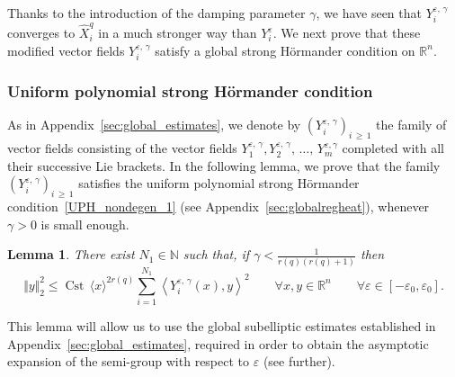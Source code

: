 \documentclass[10pt]{amsart}
\newtheorem{lemm}[theo]{Lemma}\newtheorem{prop}[theo]{Proposition}\newtheorem{coro}[theo]{Corollary}\newtheorem{conj}[theo]{Conjecture}
\theoremstyle{definition}\newtheorem{defi}[theo]{Definition}\newtheorem{rema}[theo]{Remark}\newtheorem{exam}[theo]{Example}\newtheorem{exem}[theo]{Example}\newtheorem{nota}[theo]{Notation}
\newcommand*\R{\mathbb{R}}
\newcommand*\N{\mathbb{N}}
\DeclareMathOperator{\Cst}{Cst}
\renewcommand{\geq}{\geqslant}
\renewcommand{\leq}{\leqslant}
\let\oldforall\forall
\renewcommand*{\forall}{\mathrel{\oldforall}}
\begin{document}
Thanks to the introduction of the damping parameter $\gamma$, we have seen that $Y_i^{\varepsilon,\,\gamma}$ converges to $\widehat{X}_i^{q}$ in a much stronger way than $Y_i^\varepsilon$. We next prove that these modified vector fields $Y_i^{\varepsilon,\,\gamma}$ satisfy a global strong H\"ormander condition on $\R^n$.


\subsubsection{Uniform polynomial strong H\"ormander condition}
As in Appendix~\ref{sec:global_estimates}, we denote by $(Y_i^{\varepsilon,\,\gamma})_{i\,\geq\,1}$ the family of vector fields consisting of the vector fields $Y_1^{\varepsilon,\,\gamma}, Y_2^{\varepsilon,\,\gamma},\,\ldots,\,Y_m^{\varepsilon,\gamma}$ completed with all their successive Lie brackets. In the following lemma, we prove that the family $(Y_i^{\varepsilon,\,\gamma})_{i\,\geq\,1}$ satisfies the uniform polynomial strong H\"ormander condition~\eqref{UPH_nondegen_1} (see Appendix~\ref{sec:globalregheat}), whenever $\gamma>0$ is small enough.

\begin{lemm}\label{lem_unif_poly_Hormander}
There exist $N_1\in\N$ such that, if $\gamma<\frac{1}{r(q)(r(q)+1)}$ then
\begin{equation}\label{ccl_lem_unif_poly_Hormander}
\Vert y\Vert_2^2 \leq \Cst\, \langle x\rangle^{2r(q)} \sum_{i=1}^{N_1} \left\langle Y_i^{\varepsilon,\,\gamma}(x),y\right\rangle^2
\qquad \forall x,y\in\R^n\qquad\forall \varepsilon\in[-\varepsilon_0,\varepsilon_0].
\end{equation}
\end{lemm}

This lemma will allow us to use the global subelliptic estimates established in Appendix~\ref{sec:global_estimates}, required in order to obtain the asymptotic expansion of the semi-group with respect to $\varepsilon$ (see further).
\end{document}

